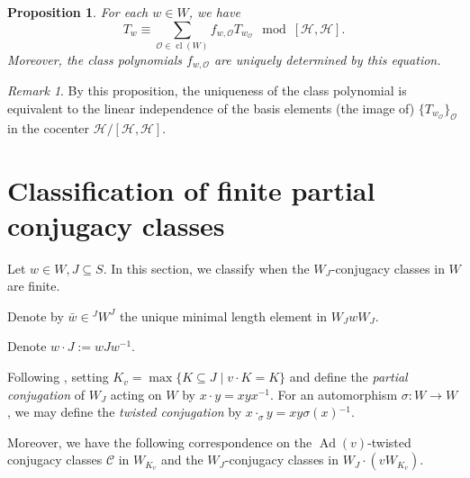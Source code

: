 \documentclass[a4paper, reqno, 14pt]{amsart}
\def\i{{^{-1}}}
\def\subset{\subseteq}
\def\co{\mathcal{O}}
\def\ch{\mathcal{H}}
\DeclareMathOperator{\Ad}{Ad}
\DeclareMathOperator{\cl}{cl}
\newtheorem{prop}[thm]{Proposition}
\theoremstyle{definition}
\newtheorem*{ass}{Assumption}
\theoremstyle{remark}
\newtheorem*{rmk}{Remark}
\numberwithin{equation}{section}
\numberwithin{thm}{section}
\begin{document}
        \begin{prop}\cite[Theorem 8.2.3]{geck2000characters}
            For each $w\in W$, we have
            \begin{equation}
                T_w\equiv \sum_{\co\in \cl(W)} f_{w,\co} T_{w_{\co}} \mod [\ch,\ch].
            \end{equation}
            Moreover, the class polynomials $f_{w,\co}$ are uniquely determined by this equation.
        \end{prop}
    \begin{rmk}
        By this proposition, the uniqueness of the class polynomial is equivalent to the linear independence of the basis elements (the image of) $\{T_{w_\co}\}_{\co}$ in the cocenter $\ch/[\ch,\ch]$.
    \end{rmk}




\section{Classification of finite partial conjugacy classes}
    Let $w\in W, J\subset S$. In this section, we classify when the $W_J$-conjugacy classes in $W$ are finite. 
    
    
     Denote by $\bar{w}\in {}^JW^J$ the unique minimal length element in $W_JwW_J$. 
     
     Denote $w\cdot J:=w J w \i$.
     
     Following \cite[Corollary 2.3,2.6]{he2007minimal}, setting $K_v=\max\{K \subset J\mid  v\cdot K=K\}$ and define the \textit{partial conjugation} of $W_J$ acting on $W$ by $x\cdot y=xyx^{-1}$. For an automorphism $\sigma: W\to W$, we may define the \textit{twisted conjugation} by $x\cdot_\sigma y=xy\sigma(x)\i$.
    
    
    Moreover, we have the following correspondence on the $\Ad(v)$-twisted conjugacy classes $\mathcal{C}$ in $W_{K_v}$ and the $W_J$-conjugacy classes in $W_J\cdot (vW_{K_v})$.
\end{document}
